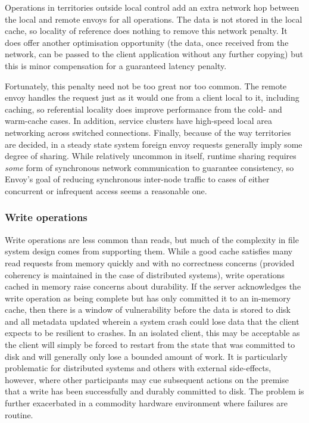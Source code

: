 Operations in territories outside local control add an extra network hop between the local and remote envoys for all operations. The data is not stored in the local cache, so locality of reference does nothing to remove this network penalty. It does offer another optimisation opportunity (the data, once received from the network, can be passed to the client application without any further copying) but this is minor compensation for a guaranteed latency penalty.

Fortunately, this penalty need not be too great nor too common. The remote envoy handles the request just as it would one from a client local to it, including caching, so referential locality does improve performance from the cold- and warm-cache cases. In addition, service clusters have high-speed local area networking across switched connections. Finally, because of the way territories are decided, in a steady state system foreign envoy requests generally imply some degree of sharing. While relatively uncommon in itself, runtime sharing requires \emph{some} form of synchronous network communication to guarantee consistency, so Envoy's goal of reducing synchronous inter-node traffic to cases of either concurrent or infrequent access seems a reasonable one.

\subsubsection{Write operations}\label{sec:data-paths-write}

Write operations are less common than reads, but much of the complexity in file system design comes from supporting them. While a good cache satisfies many read requests from memory quickly and with no correctness concerns (provided coherency is maintained in the case of distributed systems), write operations cached in memory raise concerns about durability. If the server acknowledges the write operation as being complete but has only committed it to an in-memory cache, then there is a window of vulnerability before the data is stored to disk and all metadata updated wherein a system crash could lose data that the client expects to be resilient to crashes. In an isolated client, this may be acceptable as the client will simply be forced to restart from the state that was committed to disk and will generally only lose a bounded amount of work. It is particularly problematic for distributed systems and others with external side-effects, however, where other participants may cue subsequent actions on the premise that a write has been successfully and durably committed to disk. The problem is further exacerbated in a commodity hardware environment where failures are routine.

